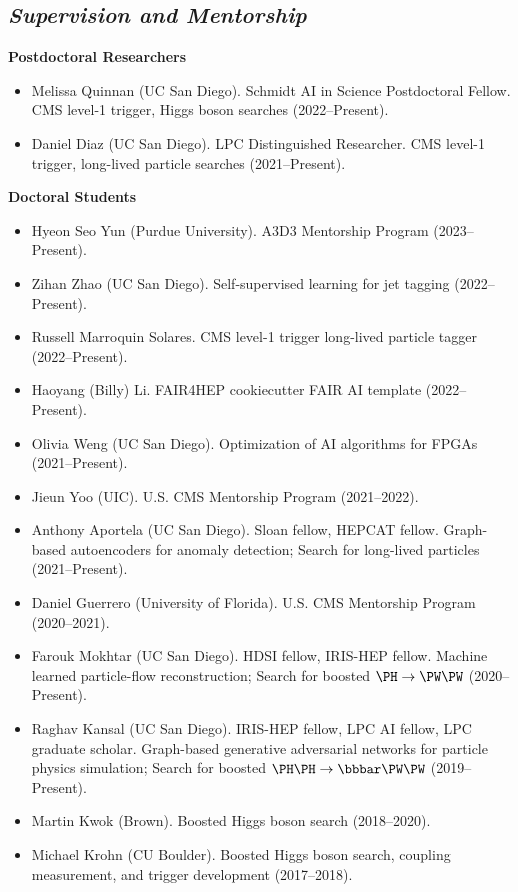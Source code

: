 \documentclass[11pt]{res}
\newcommand{\MarginText}[1]{\section{\textit{#1}}}
\begin{document}
\begin{resume}
  \MarginText{Supervision and Mentorship}

  \textbf{Postdoctoral Researchers}
  \begin{itemize}
    \itemsep-0.3em
    \item Melissa Quinnan (UC San Diego). Schmidt AI in Science Postdoctoral Fellow. CMS level-1 trigger, Higgs boson searches ({2022--Present}).
    \item Daniel Diaz (UC San Diego). LPC Distinguished Researcher. CMS level-1 trigger, long-lived particle searches ({2021--Present}).
  \end{itemize}

  \textbf{Doctoral Students}
  \begin{itemize}
    \itemsep-0.3em
    \item Hyeon Seo Yun (Purdue University). A3D3 Mentorship Program (2023--Present).
    \item Zihan Zhao (UC San Diego). Self-supervised learning for jet tagging ({2022--Present}).
    \item Russell Marroquin Solares. CMS level-1 trigger long-lived particle tagger ({2022--Present}).
    \item Haoyang (Billy) Li. FAIR4HEP cookiecutter FAIR AI template ({2022--Present}).
    \item Olivia Weng (UC San Diego). Optimization of AI algorithms for FPGAs ({2021--Present}).
    \item Jieun Yoo (UIC). U.S. CMS Mentorship Program ({2021--2022}).
    \item Anthony Aportela (UC San Diego). Sloan fellow, HEPCAT fellow. Graph-based autoencoders for anomaly detection; Search for long-lived particles ({2021--Present}).
    \item Daniel Guerrero (University of Florida). U.S. CMS Mentorship Program ({2020--2021}).
    \item Farouk Mokhtar (UC San Diego). HDSI fellow, IRIS-HEP fellow. Machine learned particle-flow reconstruction; Search for boosted $\PH\to\PW\PW$ ({2020--Present}).
    \item Raghav Kansal (UC San Diego). IRIS-HEP fellow, LPC AI fellow, LPC graduate scholar. Graph-based generative adversarial networks for particle physics simulation; Search for boosted $\PH\PH\to\bbbar\PW\PW$ ({2019--Present}).
    \item Martin Kwok (Brown). Boosted Higgs boson search ({2018--2020}).
    \item Michael Krohn (CU Boulder). Boosted Higgs boson search, coupling measurement, and trigger development ({2017--2018}).

\end{itemize}
\end{resume}
\end{document}
